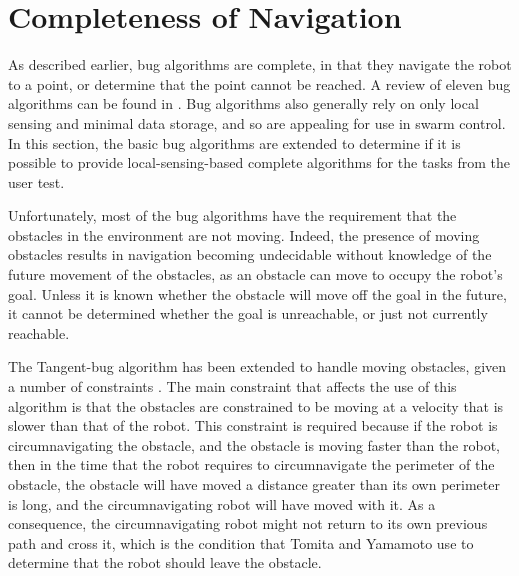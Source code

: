 \section{Completeness of Navigation} \label{sec:completeness_of_nav}

As described earlier, bug algorithms are complete, in that they navigate the robot to a point, or determine that the point cannot be reached. A review of eleven bug algorithms can be found in \citep{ng2007performance}. 
Bug algorithms also generally rely on only local sensing and minimal data storage, and so are appealing for use in swarm control. 
In this section, the basic bug algorithms are extended to determine if it is possible to provide local-sensing-based complete algorithms for the tasks from the user test. 

Unfortunately, most of the bug algorithms have the requirement that the obstacles in the environment are not moving.
Indeed, the presence of moving obstacles results in navigation becoming undecidable without knowledge of the future movement of the obstacles, as an obstacle can move to occupy the robot's goal. 
Unless it is known whether the obstacle will move off the goal in the future, it cannot be determined whether the goal is unreachable, or just not currently reachable. 

The Tangent-bug algorithm has been extended to handle moving obstacles, given a number of constraints \citep{kamon1998tangentbug, tomita2009sensor}.
The main constraint that affects the use of this algorithm is that the obstacles are constrained to be moving at a velocity that is slower than that of the robot.
This constraint is required because if the robot is circumnavigating the obstacle, and the obstacle is moving faster than the robot, then in the time that the robot requires to circumnavigate the perimeter of the obstacle, the obstacle will have moved a distance greater than its own perimeter is long, and the circumnavigating robot will have moved with it.
As a consequence, the circumnavigating robot might not return to its own previous path and cross it, which is the condition that Tomita and Yamamoto use to determine that the robot should leave the obstacle. 

